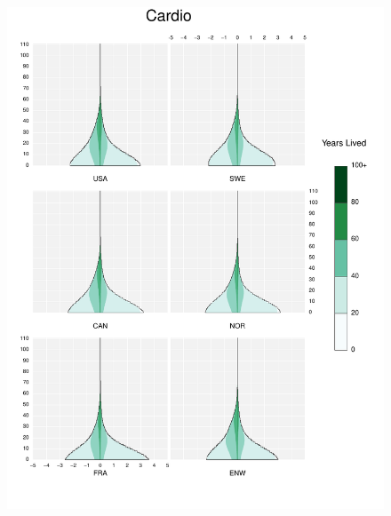 \documentclass{article}
\begin{document}
\begin{appendices}
\begin{figure}
\includegraphics[scale=.8]{Figures/Causes/DyxCardio.pdf}
\end{figure}
\begin{figure}
\centering

\end{figure}
\end{appendices}
\end{document}

